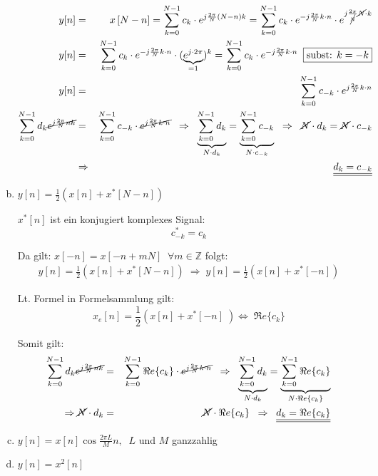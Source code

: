 \begin{uebsp}
\begin{Answer}
\begin{enumerate}[a)]
        \begin{eqnarray*}
            y[n]&=&x\left[N-n\right]=\sum_{k=0}^{N-1}c_k\cdot e^{j\frac{2\pi}{N}\left(N-n\right)k}=
            \sum_{k=0}^{N-1}c_k\cdot e^{-j\frac{2\pi}{N}k\cdot n}\cdot e^{j\frac{2\pi}{\cancel N}\cancel N\cdot k}\\
            y[n]&=&\sum_{k=0}^{N-1}c_k\cdot e^{-j\frac{2\pi}{N}k\cdot n}\cdot (\underbrace{e^{j\cdot 2\pi}}_{=1})^k=\sum_{k=0}^{N-1}c_k\cdot e^{-j\frac{2\pi}{N}k\cdot n}\;\;\fbox{subst: $k=-k$}\\
            y[n]&=&\sum_{k=0}^{N-1}c_{-k}\cdot e^{j\frac{2\pi}{N}k\cdot n}\\
            \sum_{k=0}^{N-1}d_k\cancel{e^{j\frac{2\pi}{N}nk}}&=&\sum_{k=0}^{N-1}c_{-k}\cdot \cancel{e^{j\frac{2\pi}{N}k\cdot n}}\;\;\Rightarrow\;\;
            \underbrace{\sum_{k=0}^{N-1}d_{k}}_{N\cdot d_{k}}=\underbrace{\sum_{k=0}^{N-1}c_{-k}}_{N\cdot c_{-k}}\;\;\Rightarrow\;\;
            \cancel N\cdot d_k=\cancel N\cdot c_{-k}\\
            &\Rightarrow& \underline{\underline{d_k=c_{-k}}}
        \end{eqnarray*}
        \item $y[n]=\frac{1}{2}\left(x[n]+x^*\left[N-n\right]\right)$
            \begin{uebsp_theory}
                $x^*[n]$ ist ein konjugiert komplexes Signal:
                \[c_{-k}^*=c_k\]
            \end{uebsp_theory}
            Da gilt: $x[-n]=x[-n+mN]\;\;\forall m\in\mathbb{Z}$ folgt:
            \begin{eqnarray*}
                y[n]=\frac{1}{2}(x[n]+x^*[N-n])\;\Rightarrow\;y[n]=\frac{1}{2}(x[n]+x^*[-n])
            \end{eqnarray*}
            \begin{uebsp_theory}
                Lt. Formel in Formelsammlung gilt:
                \[x_e[n]=\frac{1}{2}\left(x[n]+x^*[-n]\;\right)\Leftrightarrow\;\Re e\{c_k\}\]
            \end{uebsp_theory}
            Somit gilt:
            \begin{eqnarray*}
                \sum_{k=0}^{N-1}d_k\cancel{e^{j\frac{2\pi}{N}nk}}&=&\sum_{k=0}^{N-1}\Re e\{c_k\}\cdot \cancel{e^{j\frac{2\pi}{N}k\cdot n}}\;\;\Rightarrow\;\;
                \underbrace{\sum_{k=0}^{N-1}d_{k}}_{N\cdot d_{k}}=\underbrace{\sum_{k=0}^{N-1}\Re e\{c_k\}}_{N\cdot \Re e\{c_k\}}\\
                \Rightarrow\cancel N\cdot d_k&=&\cancel N\cdot \Re e\{c_k\}\;\;\Rightarrow\;\;
                \underline{\underline{d_k=\Re e\{c_{k}\}}}
            \end{eqnarray*}
        \item $y[n]=x[n]\cos\frac{2\pi L}{M}n,\;\;L$ und $M$ ganzzahlig
        \item $y[n]=x^2[n]$
    \end{enumerate}
\end{Answer}
\end{uebsp}

